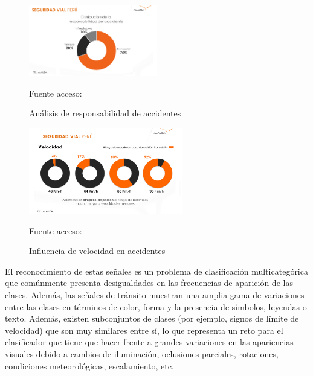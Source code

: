 	\begin{figure}[H]
	\begin{center}
	\includegraphics[width=0.5\textwidth]{images/intro/responsabilidad_cond}
	\end{center}
	\begin{center}
	\vskip -0.2cm
	\caption{\small{Análisis de responsabilidad de accidentes}}
	{\small{Fuente acceso: \citep{Gestion1}}}
	\end{center}
	\vspace{-1.5em}
	\end{figure}

	\begin{figure}[H]
	\begin{center}
	\includegraphics[width=0.6\textwidth]{images/intro/velocidad_ind}
	\end{center}
	\begin{center}
	\caption{\small{Influencia de velocidad en accidentes}}
	{\small{Fuente acceso: \citep{Gestion1}}}
	\end{center}
	\vspace{-1.5em}
	\end{figure}
	
	
	El reconocimiento de estas señales es un problema de clasificación multicategórica que comúnmente presenta desigualdades en las frecuencias de aparición de las clases. Además, las señales de tránsito muestran una amplia gama de variaciones entre las clases en términos de color, forma y la presencia de símbolos, leyendas o texto. Además, existen subconjuntos de clases (por ejemplo, signos de límite de velocidad) que son muy similares entre sí, lo que representa un reto para el clasificador que tiene que hacer frente a grandes variaciones en las apariencias visuales debido a cambios de iluminación, oclusiones parciales, rotaciones, condiciones meteorológicas, escalamiento, etc.
    

